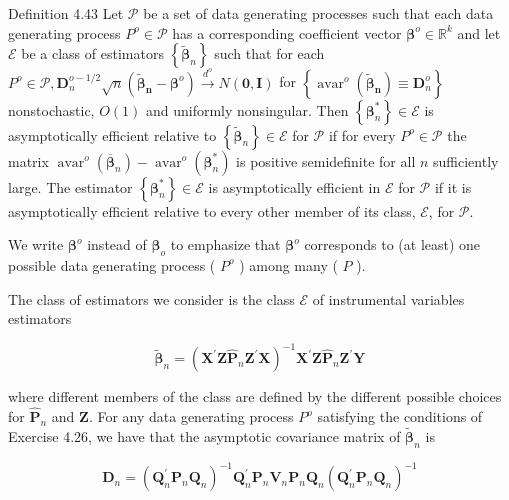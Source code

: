 \documentclass[10pt]{article}
\begin{document}
Definition 4.43 Let $\mathcal{P}$ be a set of data generating processes such that each data generating process $P^{o} \in \mathcal{P}$ has a corresponding coefficient vector $\boldsymbol{\beta}^{o} \in \mathbb{R}^{k}$ and let $\mathcal{E}$ be a class of estimators $\left\{\tilde{\boldsymbol{\beta}}_{n}\right\}$ such that for each $P^{o} \in \mathcal{P}, \mathbf{D}_{n}^{o-1 / 2} \sqrt{n}\left(\tilde{\boldsymbol{\beta}}_{\boldsymbol{n}}-\boldsymbol{\beta}^{o}\right) \xrightarrow{d^{o}} N(\mathbf{0}, \mathbf{I})$ for $\left\{\operatorname{avar}^{o}\left(\tilde{\boldsymbol{\beta}}_{\boldsymbol{n}}\right) \equiv \mathbf{D}_{n}^{o}\right\}$ nonstochastic, $O(1)$ and uniformly nonsingular. Then $\left\{\boldsymbol{\beta}_{n}^{*}\right\} \in \mathcal{E}$ is asymptotically efficient relative to $\left\{\tilde{\boldsymbol{\beta}}_{n}\right\} \in \mathcal{E}$ for $\mathcal{P}$ if for every $P^{o} \in \mathcal{P}$ the matrix $\operatorname{avar}^{o}\left(\overline{\boldsymbol{\beta}}_{n}\right)-\operatorname{avar}^{o}\left(\boldsymbol{\beta}_{n}^{*}\right)$ is positive semidefinite for all $n$ sufficiently large. The estimator $\left\{\boldsymbol{\beta}_{n}^{*}\right\} \in \mathcal{E}$ is asymptotically efficient in $\mathcal{E}$ for $\mathcal{P}$ if it is asymptotically efficient relative to every other member of its class, $\mathcal{E}$, for $\mathcal{P}$.

We write $\boldsymbol{\beta}^{o}$ instead of $\boldsymbol{\beta}_{o}$ to emphasize that $\boldsymbol{\beta}^{o}$ corresponds to (at least) one possible data generating process ( $P^{o}$ ) among many ( $P$ ).

The class of estimators we consider is the class $\mathcal{E}$ of instrumental variables estimators

$$
\tilde{\boldsymbol{\beta}}_{n}=\left(\mathbf{X}^{\prime} \mathbf{Z} \hat{\mathbf{P}}_{n} \mathbf{Z}^{\prime} \mathbf{X}\right)^{-1} \mathbf{X}^{\prime} \mathbf{Z} \hat{\mathbf{P}}_{n} \mathbf{Z}^{\prime} \mathbf{Y}
$$

where different members of the class are defined by the different possible choices for $\hat{\mathbf{P}}_{n}$ and $\mathbf{Z}$. For any data generating process $P^{o}$ satisfying the conditions of Exercise 4.26, we have that the asymptotic covariance matrix of $\tilde{\boldsymbol{\beta}}_{n}$ is

$$
\mathbf{D}_{n}=\left(\mathbf{Q}_{n}^{\prime} \mathbf{P}_{n} \mathbf{Q}_{n}\right)^{-1} \mathbf{Q}_{n}^{\prime} \mathbf{P}_{n} \mathbf{V}_{n} \mathbf{P}_{n} \mathbf{Q}_{n}\left(\mathbf{Q}_{n}^{\prime} \mathbf{P}_{n} \mathbf{Q}_{n}\right)^{-1}
$$
\end{document}
